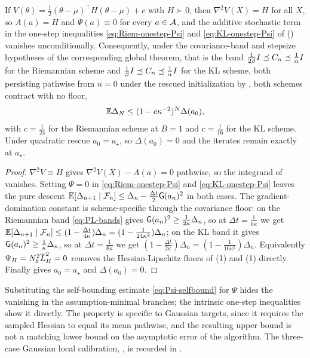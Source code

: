 \begin{proposition}
\label{prop:Gauss-nofloor}
If $V(\theta)=\tfrac12(\theta-\mu)^\top H(\theta-\mu)+c$ with $H\succ0$, then $\nabla^2V(X)=H$ for all
$X$, so $A(a)=H$ and $\Psi(a)\equiv0$ for every $a\in\mathcal{A}$, and the additive stochastic term in the
one-step inequalities \eqref{eq:Riem-onestep-Psi} and \eqref{eq:KL-onestep-Psi} of
 () vanishes
unconditionally. Consequently, under the covariance-band and stepsize hypotheses of the corresponding
global theorem, that is the band $\tfrac1{2\beta}I\preceq C_n\preceq\tfrac1\alpha I$ for the
Riemannian scheme and $\tfrac1\beta I\preceq C_n\preceq\tfrac1\alpha I$ for the KL scheme, both
persisting pathwise from $n=0$ under the rescued initialization by , both schemes
contract with no floor,
\[
    \mathbb{E}\Delta_N\leq(1-c\kappa^{-2})^N\Delta(a_0),
\]
with $c=\tfrac1{24}$ for the Riemannian scheme at $B=1$ and $c=\tfrac1{16}$ for the KL scheme. Under
quadratic rescue $a_0=a_\star$, so $\Delta(a_0)=0$ and the iterates remain exactly at $a_\star$.
\end{proposition}

\begin{proof}
$\nabla^2V\equiv H$ gives $\nabla^2V(X)-A(a)=0$ pathwise, so the integrand of  vanishes.
Setting $\Psi=0$ in \eqref{eq:Riem-onestep-Psi} and \eqref{eq:KL-onestep-Psi} leaves the pure descent
$\mathbb{E}[\Delta_{n+1}\mid\mathcal{F}_n]\leq\Delta_n-\tfrac{\Delta t}2\mathsf{G}(a_n)^2$ in both cases. The
gradient-domination constant is scheme-specific through the covariance floor: on the Riemannian band
\eqref{eq:PL-bands} gives $\mathsf{G}(a_n)^2\geq\tfrac1{2\kappa}\Delta_n$, so at $\Delta t=\tfrac1{6\kappa}$
we get $\mathbb{E}[\Delta_{n+1}\mid\mathcal{F}_n]\leq(1-\tfrac{\Delta t}{4\kappa})\Delta_n=(1-\tfrac1{24\kappa^2})\Delta_n$;
on the KL band it gives $\mathsf{G}(a_n)^2\geq\tfrac1\kappa\Delta_n$, so at $\Delta t=\tfrac1{8\kappa}$
we get $(1-\tfrac{\Delta t}{2\kappa})\Delta_n=(1-\tfrac1{16\kappa^2})\Delta_n$. Equivalently
$\Psi_H=N_\theta^2\overline{L}_H^2=0$ removes the Hessian-Lipschitz floors of
(1) and (1) directly. Finally
 gives $a_0=a_\star$ and $\Delta(a_0)=0$.
\end{proof}

Substituting the self-bounding estimate \eqref{eq:Psi-selfbound} for $\Psi$ hides the vanishing in the
assumption-minimal branches; the intrinsic one-step inequalities show it directly. The property is
specific to Gaussian
targets, since it requires the sampled Hessian to equal its mean pathwise, and the resulting upper
bound is not a matching lower bound on the asymptotic error of the algorithm.
The three-case Gaussian local calibration, , is recorded in
.

